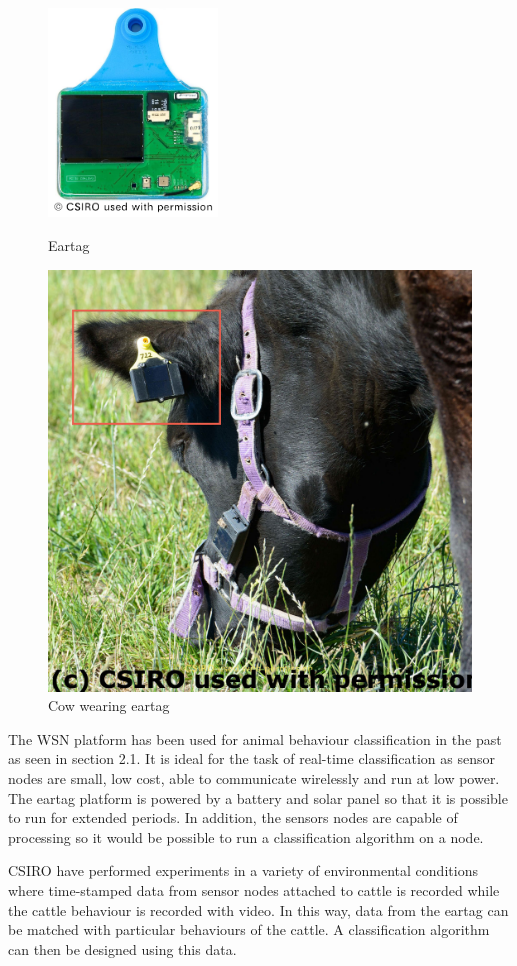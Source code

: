 \begin{figure}[ht!]
\centering
\begin{minipage}{.5\textwidth}
  \centering
  \includegraphics[width=0.4\textwidth]{images/eartag.png}
  \caption{Eartag}
  \label{eartag}
\end{minipage}%
\begin{minipage}{.5\textwidth}
  \centering
  \includegraphics[width=.5\textwidth]{images/cow.jpg}
  \caption{Cow wearing eartag}
  \label{cow}
\end{minipage}
\end{figure}


The WSN platform has been used for animal behaviour classification in the past as seen in section 2.1. It is ideal for the task of real-time classification as sensor nodes are small, low cost, able to communicate wirelessly and run at low power. The eartag platform is powered by a battery and solar panel so that it is possible to run for extended periods. In addition, the sensors nodes are capable of processing so it would be possible to run a classification algorithm on a node. 

CSIRO have performed experiments in a variety of environmental conditions where time-stamped data from sensor nodes attached to cattle is recorded while the cattle behaviour is recorded with video. In this way, data from the eartag can be matched with particular behaviours of the cattle. A classification algorithm can then be designed using this data.